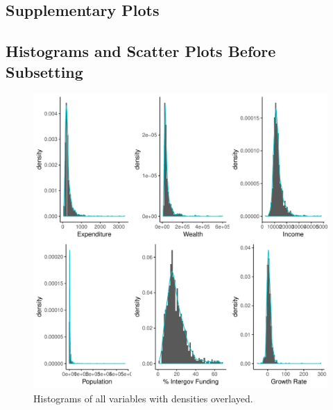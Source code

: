 \documentclass{article}\usepackage[]{graphicx}\usepackage[]{color}
\makeatletter
\def\maxwidth{ %
  \ifdim\Gin@nat@width>\linewidth
    \linewidth
  \else
    \Gin@nat@width
  \fi
}
\newenvironment{knitrout}{}{} %
\makeatother
\begin{document}
\newpage
\begin{appendices}

\section{Supplementary Plots} \label{appendix_plots}

\subsection{Histograms and Scatter Plots Before Subsetting}

\begin{knitrout}
\color{fgcolor}\begin{figure}[h!]
\includegraphics[width=\maxwidth]{figure/r_append_hist-1} \caption[Histograms of all variables with densities overlayed]{Histograms of all variables with densities overlayed.}\label{fig:r append_hist}
\end{figure}


\end{knitrout}




\end{appendices}
\end{document}
